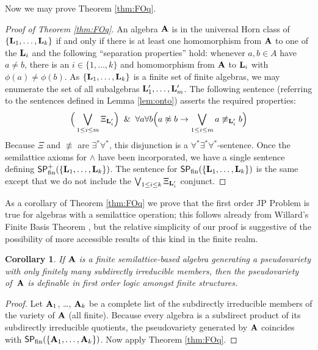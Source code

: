 \documentclass[reqno]{amsart}
\theoremstyle{plain}
\newtheorem{cor}[thm]{Corollary}
\theoremstyle{definition}
\begin{document}
Now we may prove Theorem \ref{thm:FOq}.
\begin{proof}[Proof of Theorem \ref{thm:FOq}]
An algebra ${\bf A}$ is in the universal Horn class of $\{{\bf L}_1,\dots,{\bf L}_k\}$ if and only if  there is at least one homomorphism from ${\bf A}$ to one of the ${\bf L}_i$ and the following ``separation properties'' hold: whenever $a,b\in A$ have $a\neq b$, there is an $i\in\{1,\dots,k\}$ and homomorphism from ${\bf A}$ to ${\bf L}_i$ with $\phi(a)\neq \phi(b)$.  As $\{{\bf L}_1,\dots,{\bf L}_k\}$ is a finite set of finite algebras, we may enumerate the set of all subalgebras ${\bf L}'_1,\dots, {\bf L}_m'$.  The following sentence (referring to the sentences defined in Lemma \ref{lem:onto}) asserts the required properties:
\[
\Big(\bigvee_{1\leq i\leq m}\Xi_{{\bf L}'_i}\Big)\And \forall a\forall b \Big(a\not\approx b\rightarrow \bigvee_{1\leq i\leq m}a\not\equiv_{{\bf L}'_i} b\Big)
\]
Because $\Xi$ and $\not\equiv$ are $\exists^*\forall^*$, this disjunction is a $\forall^*\exists^*\forall^*$-sentence.  Once the semilattice axioms for $\wedge$ have been incorporated, we have a single sentence defining $\mathsf{SP}_{\rm fin}^+(\{{\bf L}_1,\dots,{\bf L}_k\})$.  The sentence for $\mathsf{SP}_{\rm fin}(\{{\bf L}_1,\dots,{\bf L}_k\})$ is the same except that we do not  include the $\bigvee_{1\leq i\leq k}\Xi_{{\bf L}'_i}$ conjunct.
\end{proof}

As a corollary of Theorem \ref{thm:FOq} we prove that the first order JP Problem is true for algebras with a semilattice operation; this follows already from Willard's Finite Basis Theorem \cite{wil}, but the relative simplicity of our proof is suggestive of the possibility of more accessible results of this kind in the finite realm.
\begin{cor}\label{cor:willard}
If ${\bf A}$ is a finite semilattice-based algebra generating a pseudovariety with only finitely many subdirectly irreducible members, then the pseudovariety of~${\bf A}$ is definable in first order logic amongst finite structures.
\end{cor}
\begin{proof}
Let ${\bf A}_1$, \dots, ${\bf A}_k$ be a complete list of the subdirectly irreducible members of the variety of ${\bf A}$ (all finite).  Because every algebra is a subdirect product of its subdirectly irreducible quotients,  the pseudovariety generated by ${\bf A}$ coincides with $\mathsf{SP}_{\rm fin}(\{{\bf A}_1,\dots,{\bf A}_k\})$.  Now apply Theorem \ref{thm:FOq}.
\end{proof}
\end{document}
